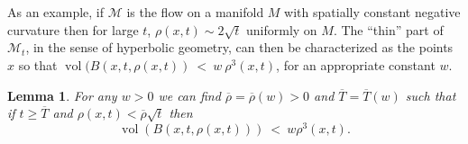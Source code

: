 \documentclass[12pt]{amsart}
\newcommand{\M}{{\mathcal M}}
\newcommand{\vol}{\operatorname{vol}}
\numberwithin{equation}{section}
\theoremstyle{plain}
\newtheorem{lemma}[equation]{Lemma}
\theoremstyle{definition}
\theoremstyle{remark}
\begin{document}
As an example, if $\M$ is the flow on a manifold $M$ with spatially constant negative
curvature then for large $t$, $\rho(x,t) \sim 2 \sqrt{t}$ uniformly on $M$.
The ``thin'' part of $\M_t$, in the sense of hyperbolic geometry, can then be
characterized as the points $x$ so that $\vol(B(x,t,\rho(x,t)) \: < \: w \:
\rho^3(x,t)$, for an appropriate constant $w$.

\begin{lemma} \label{bigenough}
For any $w > 0$ we can find $\overline{\rho} = \overline{\rho}(w) > 0$
and $\overline{T}=\overline{T}(w)$
such that if $t\geq \overline{T}$ and $\rho(x,t) < \overline{\rho} \sqrt{t}$ then
\begin{equation}
\vol(B(x,t,\rho(x,t))) \: < \: w \rho^3(x,t).
\end{equation}
\end{lemma}
\end{document}
